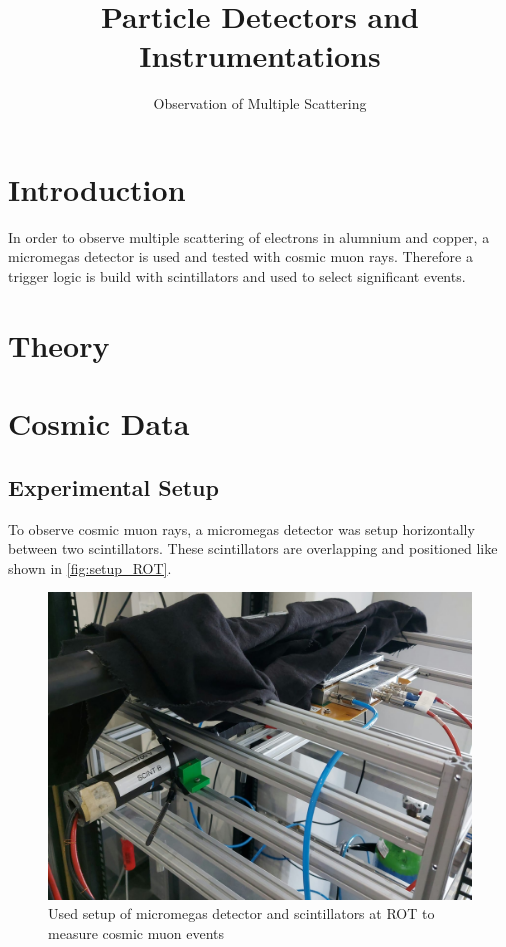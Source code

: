 \documentclass[sn-mathphys-num,iicol]{sn-jnl}
\theoremstyle{thmstyleone}
\theoremstyle{thmstyletwo}
\theoremstyle{thmstylethree}
\begin{document}
        
\title[]{Particle Detectors and Instrumentations}
\subtitle{Observation of Multiple Scattering}
\author*[1]{ }
\author*[1]{ }

\maketitle

\section{Introduction}
In order to observe multiple scattering of electrons in alumnium and copper, a micromegas detector is used and tested with cosmic muon rays. Therefore a trigger logic is build with scintillators and used to select significant events.




\section{Theory}

\section{Cosmic Data}
\subsection{Experimental Setup}
To observe cosmic muon rays, a micromegas detector was setup horizontally between two scintillators. 
These scintillators are overlapping and positioned like shown in \autoref{fig:setup_ROT}.

\begin{figure}
  \includegraphics[width=\linewidth]{figures/setup_ROT.jpeg}
  \caption{Used setup of micromegas detector and scintillators at ROT to measure cosmic muon events}
  \label{fig:setup_ROT}
\end{figure}
\end{document}
